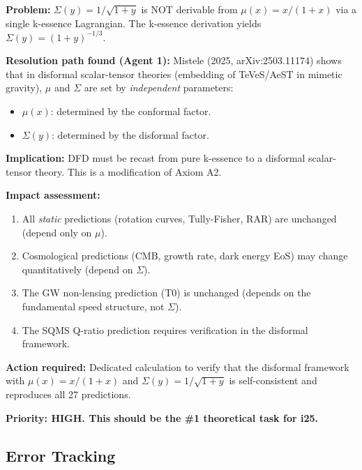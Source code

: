 \documentclass[11pt]{article}
\begin{document}
\begin{tcolorbox}[colback=orange!5!white, colframe=orange!70!black,
  title=\textbf{$\Sigma(y)$ GAP --- STATUS REPORT}]

\textbf{Problem:} $\Sigma(y) = 1/\sqrt{1+y}$ is NOT derivable from
$\mu(x) = x/(1+x)$ via a single k-essence Lagrangian. The k-essence
derivation yields $\Sigma(y) = (1+y)^{-1/3}$.

\textbf{Resolution path found (Agent 1):} Mistele (2025, arXiv:2503.11174)
shows that in disformal scalar-tensor theories (embedding of TeVeS/AeST
in mimetic gravity), $\mu$ and $\Sigma$ are set by \emph{independent}
parameters:
\begin{itemize}
  \item $\mu(x)$: determined by the conformal factor.
  \item $\Sigma(y)$: determined by the disformal factor.
\end{itemize}

\textbf{Implication:} DFD must be recast from pure k-essence to a
disformal scalar-tensor theory. This is a modification of Axiom A2.

\textbf{Impact assessment:}
\begin{enumerate}
  \item All \emph{static} predictions (rotation curves, Tully-Fisher,
    RAR) are unchanged (depend only on $\mu$).
  \item Cosmological predictions (CMB, growth rate, dark energy EoS)
    may change quantitatively (depend on $\Sigma$).
  \item The GW non-lensing prediction (T0) is unchanged (depends on
    the fundamental speed structure, not $\Sigma$).
  \item The SQMS Q-ratio prediction requires verification in the
    disformal framework.
\end{enumerate}

\textbf{Action required:} Dedicated calculation to verify that the
disformal framework with $\mu(x) = x/(1+x)$ and $\Sigma(y) = 1/\sqrt{1+y}$
is self-consistent and reproduces all 27 predictions.

\textbf{Priority: HIGH. This should be the \#1 theoretical task for i25.}

\end{tcolorbox}

\subsection{Error Tracking}
\end{document}

